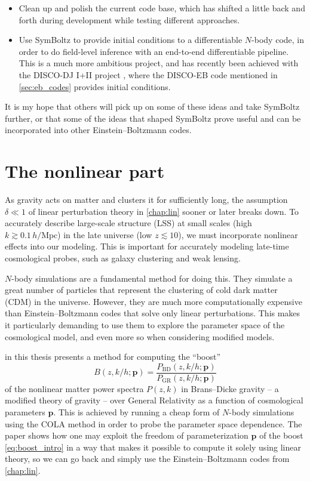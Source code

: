 \documentclass[USenglish, thumbmarks]{uiophdthesis} %
\newcommand\EB{Einstein--Boltzmann}
\newcommand\GR{General Relativity}
\newcommand\BD{Brans--Dicke}
\begin{document}
\begin{itemize}
to take further advantage of the smooth approximation-free output,
for example in line-of-sight integration (as discussed in \cref{sec:spectral}).
\item Clean up and polish the current code base,
which has shifted a little back and forth during development
while testing different approaches.
\item
Use SymBoltz to provide initial conditions to a differentiable $N$-body code,
in order to do field-level inference \cite[e.g.][]{leclercqFieldlevelInferenceCosmology2025} with an end-to-end differentiable pipeline.
This is a much more ambitious project, and has recently been achieved with the DISCO-DJ I+II project \cite{hahnDISCODJDifferentiableEinsteinBoltzmann2024a,listDISCODJIIDifferentiable2026},
where the DISCO-EB code mentioned in \cref{sec:eb_codes} provides initial conditions.
\end{itemize}
It is my hope that others will pick up on some of these ideas and take SymBoltz further,
or that some of the ideas that shaped SymBoltz prove useful and can be incorporated into other \EB{} codes.

\chapter{The nonlinear part}
\label{chap:nonlin}

As gravity acts on matter and clusters it for sufficiently long,
the assumption $\delta \ll 1$ of linear perturbation theory in \cref{chap:lin} sooner or later breaks down.
To accurately describe large-scale structure (LSS) at small scales (high $k \gtrsim 0.1\,h/\mathrm{Mpc}$) in the late universe (low $z \lesssim 10$),
we must incorporate nonlinear effects into our modeling.
This is important for accurately modeling late-time cosmological probes,
such as galaxy clustering and weak lensing.

$N$-body simulations are a fundamental method for doing this.
They simulate a great number of particles that represent the clustering of cold dark matter (CDM) in the universe.
However, they are much more computationally expensive than \EB{} codes that solve only linear perturbations.
This makes it particularly demanding to use them to explore the parameter space of the cosmological model,
and even more so when considering modified models.

 in this thesis presents a method for computing the \enquote{boost}
\begin{equation}
B(z, k/h; \mathbf{p}) = \frac{P_\mathrm{BD}(z,k/h; \mathbf{p})}{P_\mathrm{GR}(z,k/h; \mathbf{p})}
\label{eq:boost_intro}
\end{equation}
of the nonlinear matter power spectra $P(z,k)$ in \BD{} gravity
-- a modified theory of gravity --
over \GR{} as a function of cosmological parameters $\mathbf{p}$.
This is achieved by running a cheap form of $N$-body simulations using the COLA method
in order to probe the parameter space dependence.
The paper shows how one may exploit the freedom of parameterization $\mathbf{p}$ of the boost \eqref{eq:boost_intro}
in a way that makes it possible to compute it solely using linear theory,
so we can go back and simply use the \EB{} codes from \cref{chap:lin}.
\end{document}
